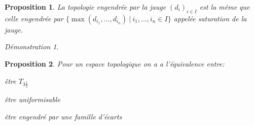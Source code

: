 \documentclass[a4paper, 11pt, french]{book}
\newenvironment{itemise}{\itemize}{\enditemize}
\let\colour=\color
\theoremstyle{plain} %
\newtheorem{proposition}{Proposition}
\theoremstyle{definition} %
\theoremstyle{remark} %
\newtheorem*{demonstration}{Démonstration}
\newcommand{\1}{\mathds{1}}
\newcommand\ens[2]{\{#1 \ |\ #2\}}
\begin{document}
\begin{proposition}
	La topologie engendrée par la jauge $(d_i)_{i\in I}$ est la même que celle engendrée par $\ens{\max(d_{i_1}, ..., d_{i_n})}{i_1, ..., i_n\in I}$ appelée saturation de la jauge.
\end{proposition}

\begin{demonstration}
	\colour{red}{À démontrer}
\end{demonstration}

\begin{proposition}
	Pour un espace topologique on a a l'équivalence entre:
	\begin{itemise}
		\item être $T_{3\frac{1}{2}}$
		\item être uniformisable
		\item être engendré par une famille d'écarts
	\end{itemise}
\end{proposition}
\end{document}
